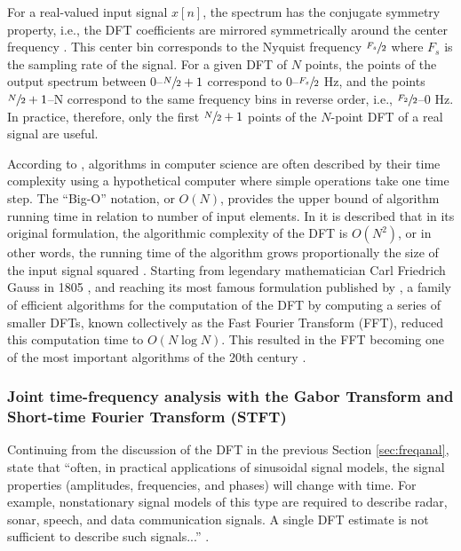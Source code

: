 \documentclass[report.tex]{subfiles}
\begin{document}
For a real-valued input signal $x[n]$, the spectrum has the conjugate symmetry property, i.e., the DFT coefficients are mirrored symmetrically around the center frequency \parencite{dspfirst}. This center bin corresponds to the Nyquist frequency $\sfrac{F_{s}}{2}$ where $F_{s}$ is the sampling rate of the signal. For a given DFT of $N$ points, the points of the output spectrum between 0--$\sfrac{N}{2}+1$ correspond to 0--$\sfrac{F_{s}}{2}$ Hz, and the points $\sfrac{N}{2}+1$--N correspond to the same frequency bins in reverse order, i.e., $\sfrac{F_{2}}{2}$--0 Hz. In practice, therefore, only the first $\sfrac{N}{2}+1$ points of the $N$-point DFT of a real signal are useful.

According to \textcite{skiena}, algorithms in computer science are often described by their time complexity using a hypothetical computer where simple operations take one time step. The ``Big-O'' notation, or $O(N)$, provides the upper bound of algorithm running time in relation to number of input elements. In \textcite[Chapter~9]{discretebook} it is described that in its original formulation, the algorithmic complexity of the DFT is $O(N^{2})$, or in other words, the running time of the algorithm grows proportionally the size of the input signal squared \parencite{skiena}.  Starting from legendary mathematician Carl Friedrich Gauss in 1805 \parencite{gausshist}, and reaching its most famous formulation published by \textcite{cooleytukey}, a family of efficient algorithms for the computation of the DFT by computing a series of smaller DFTs, known collectively as the Fast Fourier Transform (FFT), reduced this computation time to $O(N \log{N})$. This resulted in the FFT becoming one of the most important algorithms of the 20th century \parencite{ffttopten}.

\newpagefill

\subsubsection{Joint time-frequency analysis with the Gabor Transform and Short-time Fourier Transform (STFT)}
\label{sec:jointtfa}

Continuing from the discussion of the DFT in the previous Section \ref{sec:freqanal},\citeauthor{discretebook} state that ``often, in practical applications of sinusoidal signal models, the signal properties (amplitudes, frequencies, and phases) will change with time. For example, nonstationary signal models of this type are required to describe radar, sonar, speech, and data communication signals. A single DFT estimate is not sufficient to describe such signals...'' \parencite[714]{discretebook}.
\end{document}
